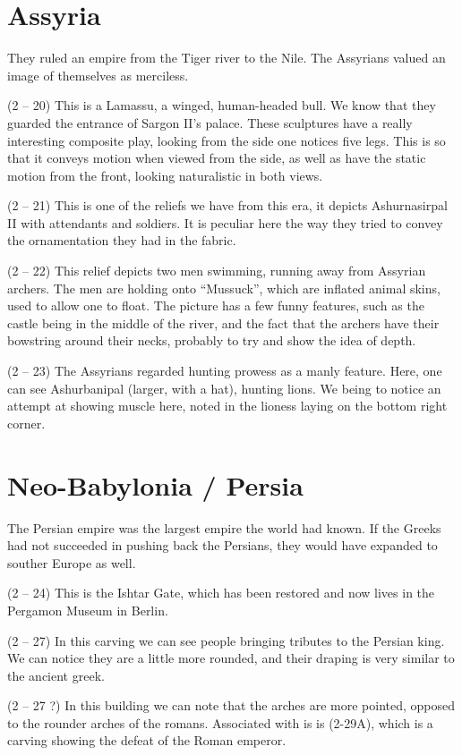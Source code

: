 \documentclass{article}
\begin{document}
\begin{spacing}{1.2}
    \section{Assyria}
    They ruled an empire from the Tiger river to the Nile. The Assyrians valued 
    an image of themselves as merciless.

    (2 -- 20) This is a Lamassu, a winged, human-headed bull. We know that they 
    guarded the entrance of Sargon II's palace. These sculptures have a really 
    interesting composite play, looking from the side one notices five legs. 
    This is so that it conveys motion when viewed from the side, as well as have the static motion from the front, looking naturalistic in both views.
    
    (2 -- 21) This is one of the reliefs we have from this era, it depicts 
    Ashurnasirpal II with attendants and soldiers. It is peculiar here the way 
    they tried to convey the ornamentation they had in the fabric.
    
    (2 -- 22) This relief depicts two men swimming, running away from Assyrian 
    archers.  The men are holding onto ``Mussuck'', which are inflated animal 
    skins, used to allow one to float. The picture has a few funny features, 
    such as the castle being in the middle of the river, and the fact that the 
    archers have their bowstring around their necks, probably to try and show 
    the idea of depth.

    (2 -- 23) The Assyrians regarded hunting prowess as a manly feature. Here, 
    one can see Ashurbanipal (larger, with a hat), hunting lions. We being to 
    notice an attempt at showing muscle here, noted in the lioness laying on 
    the bottom right corner.

    \section{Neo-Babylonia / Persia}
    The Persian empire was the largest empire the world had known. If the Greeks had not succeeded in pushing back the Persians, they would have expanded to souther Europe as well.

    (2 -- 24) This is the Ishtar Gate, which has been restored and now lives in 
    the Pergamon Museum in Berlin. 

    (2 -- 27) In this carving we can see people bringing tributes to the 
    Persian king. We can notice they are a little more rounded, and their 
    draping is very similar to the ancient greek. 

    (2 -- 27 ?) In this building we can note that the arches are more pointed, 
    opposed to the rounder arches of the romans. Associated with is is (2-29A), 
    which is a carving showing the defeat of the Roman emperor.

\end{spacing}
    
\end{document}
